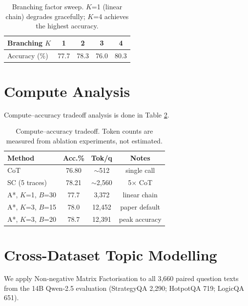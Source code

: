 \documentclass[10pt]{article}
\begin{document}
\begin{table}[ht]
\centering
\small
\begin{tabular}{lcccc}
\toprule
\textbf{Branching $K$} & 1 & 2 & 3 & 4 \\
\midrule
Accuracy (\%) & 77.7 & 78.3 & 76.0 & 80.3 \\
\bottomrule
\end{tabular}
\caption{Branching factor sweep. $K$=1 (linear chain) degrades gracefully; $K$=4 achieves the highest accuracy.}
\label{tab:sensitivity_branch}
\end{table}

\section{Compute Analysis}
\label{app:compute}
Compute--accuracy tradeoff analysis is done in Table \ref{tab:compute}.
\begin{table}[ht]
\centering
\small
\begin{tabular}{lccc}
\toprule
\textbf{Method} & \textbf{Acc.\%} & \textbf{Tok/q} & \textbf{Notes} \\
\midrule
CoT & 76.80 & $\sim$512 & single call \\
SC (5 traces) & 78.21 & $\sim$2,560 & 5$\times$ CoT \\
A*, $K$=1, $B$=30 & 77.7 & 3,372 & linear chain \\
A*, $K$=3, $B$=15 & 78.0 & 12,452 & paper default \\
A*, $K$=3, $B$=20 & 78.7 & 12,391 & peak accuracy \\
\bottomrule
\end{tabular}
\caption{Compute--accuracy tradeoff. Token counts are measured from ablation experiments, not estimated.}
\label{tab:compute}
\end{table}



\section{Cross-Dataset Topic Modelling}
\label{app:topics}

We apply Non-negative Matrix Factorisation \cite[NMF;][]{lee1999learning} to all 3,660 paired question texts from the 14B Qwen-2.5 evaluation (StrategyQA 2,290; HotpotQA 719; LogicQA 651).
\end{document}
